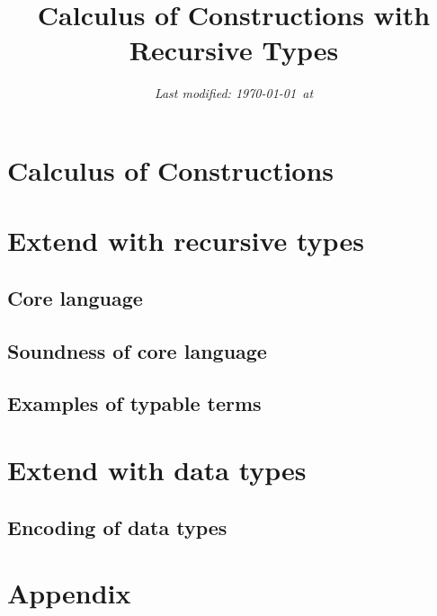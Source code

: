 \documentclass[oneside,a4paper]{article}
\title{\bf Calculus of Constructions with Recursive Types}
\author{}
\date{\small \it Last modified: \today\ at \currenttime}
\theoremstyle{break}
\begin{document}
\maketitle

\section{Calculus of Constructions}

\section{Extend with recursive types}
\subsection{Core language}

\subsection{Soundness of core language}

\subsection{Examples of typable terms}

\section{Extend with data types}
\subsection{Encoding of data types}

\nocite{*}  

\appendix
\section{Appendix}

\end{document}
